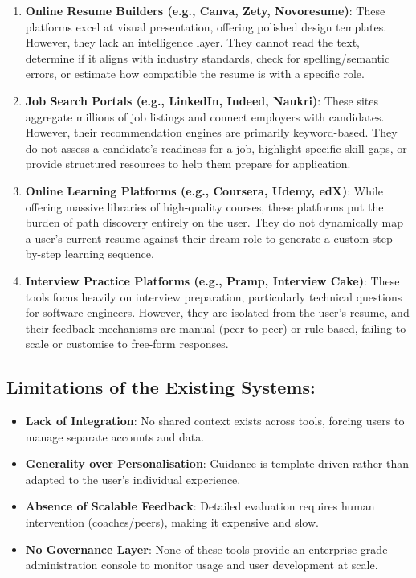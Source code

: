 \documentclass[12pt,a4paper]{article}
\begin{document}
\begin{enumerate}
    \item \textbf{Online Resume Builders (e.g., Canva, Zety, Novoresume)}: These platforms excel at visual presentation, offering polished design templates. However, they lack an intelligence layer. They cannot read the text, determine if it aligns with industry standards, check for spelling/semantic errors, or estimate how compatible the resume is with a specific role.
    \item \textbf{Job Search Portals (e.g., LinkedIn, Indeed, Naukri)}: These sites aggregate millions of job listings and connect employers with candidates. However, their recommendation engines are primarily keyword-based. They do not assess a candidate's readiness for a job, highlight specific skill gaps, or provide structured resources to help them prepare for application.
    \item \textbf{Online Learning Platforms (e.g., Coursera, Udemy, edX)}: While offering massive libraries of high-quality courses, these platforms put the burden of path discovery entirely on the user. They do not dynamically map a user's current resume against their dream role to generate a custom step-by-step learning sequence.
    \item \textbf{Interview Practice Platforms (e.g., Pramp, Interview Cake)}: These tools focus heavily on interview preparation, particularly technical questions for software engineers. However, they are isolated from the user's resume, and their feedback mechanisms are manual (peer-to-peer) or rule-based, failing to scale or customise to free-form responses.
\end{enumerate}

\subsection{Limitations of the Existing Systems:}
\begin{itemize}
    \item \textbf{Lack of Integration}: No shared context exists across tools, forcing users to manage separate accounts and data.
    \item \textbf{Generality over Personalisation}: Guidance is template-driven rather than adapted to the user's individual experience.
    \item \textbf{Absence of Scalable Feedback}: Detailed evaluation requires human intervention (coaches/peers), making it expensive and slow.
    \item \textbf{No Governance Layer}: None of these tools provide an enterprise-grade administration console to monitor usage and user development at scale.
\end{itemize}
\end{document}
